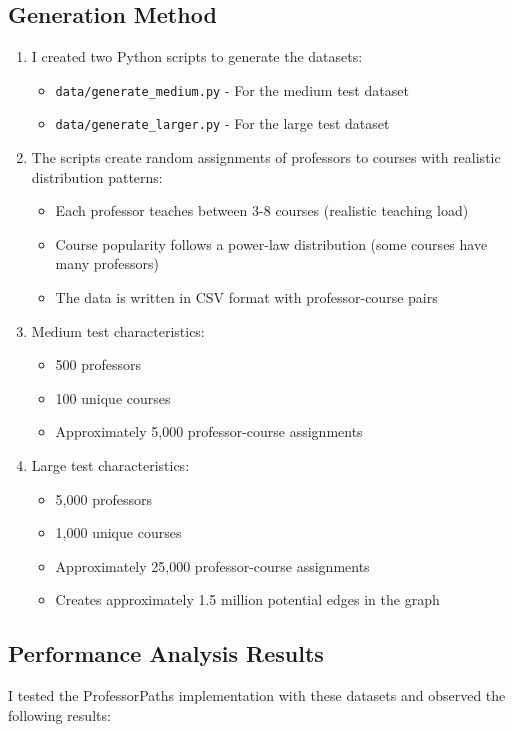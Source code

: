 \documentclass[11pt]{article}
\begin{document}
\subsection*{Generation Method}
\begin{enumerate}
    \item I created two Python scripts to generate the datasets:
    \begin{itemize}
        \item \texttt{data/generate\_medium.py} - For the medium test dataset
        \item \texttt{data/generate\_larger.py} - For the large test dataset
    \end{itemize}
    
    \item The scripts create random assignments of professors to courses with realistic distribution patterns:
    \begin{itemize}
        \item Each professor teaches between 3-8 courses (realistic teaching load)
        \item Course popularity follows a power-law distribution (some courses have many professors)
        \item The data is written in CSV format with professor-course pairs
    \end{itemize}
    
    \item Medium test characteristics:
    \begin{itemize}
        \item 500 professors
        \item 100 unique courses
        \item Approximately 5,000 professor-course assignments
    \end{itemize}
    
    \item Large test characteristics:
    \begin{itemize}
        \item 5,000 professors
        \item 1,000 unique courses
        \item Approximately 25,000 professor-course assignments
        \item Creates approximately 1.5 million potential edges in the graph
    \end{itemize}
\end{enumerate}

\subsection*{Performance Analysis Results}
I tested the ProfessorPaths implementation with these datasets and observed the following results:
\end{document}
